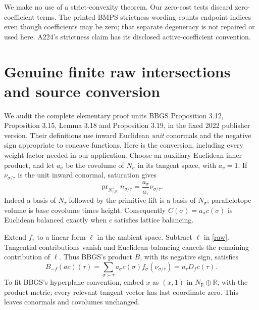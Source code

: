 \documentclass[11pt]{article}
\newcommand{\R}{\mathbb R}
\begin{document}
We make no use of a strict-convexity theorem. Our zero-cost tests discard
zero-coefficient terms. The printed BMPS strictness wording counts endpoint
indices even though coefficients may be zero; that separate degeneracy is
not repaired or used here. A224's strictness claim has its disclosed
active-coefficient convention.

\section{Genuine finite raw intersections and source conversion}
We audit the complete elementary proof units BBGS Proposition 3.12,
Proposition 3.15, Lemma 3.18 and Proposition 3.19, in the fixed 2022
publisher version. Their definitions use inward Euclidean \emph{unit}
conormals and the negative sign appropriate to concave functions. Here is
the conversion, including every weight factor needed in our application.
Choose an auxiliary Euclidean inner product, and let \(a_\sigma\) be
the covolume of \(N_\sigma\) in its tangent space, with \(a_v=1\).
If \(\nu_{\sigma/\tau}\) is the unit inward conormal, saturation gives
\begin{equation}\label{height}
 \operatorname{pr}_{N_{\tau,\R}^{\perp}}n_{\sigma/\tau}
   =\frac{a_\sigma}{a_\tau}\nu_{\sigma/\tau}.
\end{equation}
Indeed a basis of \(N_\tau\) followed by the primitive lift is a basis of
\(N_\sigma\); parallelotope volume is base covolume times height.
Consequently \(C(\sigma)=a_\sigma c(\sigma)\) is Euclidean balanced exactly
when \(c\) satisfies lattice balancing.

Extend \(f_\tau\) to a linear form \(\ell\) in the ambient space. Subtract
\(\ell\) in \eqref{raw}. Tangential contributions vanish and Euclidean
balancing cancels the remaining contribution of \(\ell\). Thus BBGS's
product \(B\), with its negative sign, satisfies
\begin{equation}\label{convert}
 B_{-f}(ac)(\tau)
 =\sum_{\sigma\succ\tau}a_\sigma c(\sigma)f_\sigma(\nu_{\sigma/\tau})
 =a_\tau D_f c(\tau).
\end{equation}
To fit BBGS's hyperplane convention, embed \(x\) as \((x,1)\) in
\(N_\R\oplus\R\), with the product metric; every relevant tangent vector
has last coordinate zero. This leaves conormals and covolumes unchanged.
\end{document}

